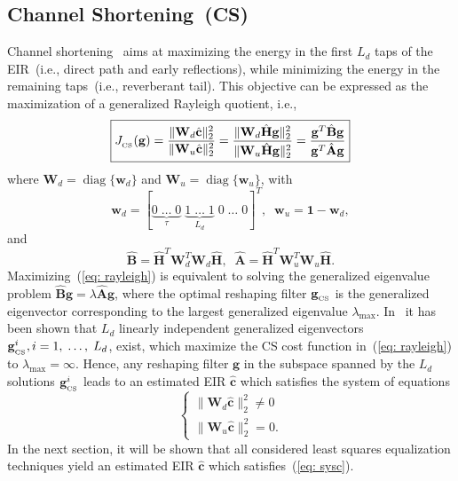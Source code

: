 \documentclass[10pt]{IEEEtran}
\DeclareMathOperator{\diag}{diag}
\begin{document}
\subsection{Channel Shortening~(CS)}
Channel shortening~\cite{Zhang_IWAENC_2010, Kallinger_ICASSP_2006} aims at maximizing the energy in the first $L_d$ taps of the EIR~(i.e., direct path and early reflections), while minimizing the energy in the remaining taps~(i.e., reverberant tail).
This objective can be expressed as the maximization of a generalized Rayleigh quotient, i.e.,
\begin{equation}
\label{eq: rayleigh}
\boxed{J_{_{\rm CS}} (\mathbf{g}) = \frac{\|\mathbf{W}_d\hat{\mathbf{c}}\|_2^2}{\|\mathbf{W}_u\hat{\mathbf{c}}\|_2^2} =  \frac{\|\mathbf{W}_d\hat{\mathbf{H}}\mathbf{g}\|_2^2}{\|\mathbf{W}_u\hat{\mathbf{H}}\mathbf{g}\|_2^2} = \frac{\mathbf{g}^T \hat{\mathbf{B}} \mathbf{g}}{\mathbf{g}^T \hat{\mathbf{A}} \mathbf{g}}}
\end{equation}
where $\mathbf{W}_d = {\diag}\{\mathbf{w}_d\}$ and $\mathbf{W}_u = {\diag}\{\mathbf{w}_u\}$, with
\begin{equation}
\label{eq: wincs}
\mathbf{w}_d  = [\underbrace{0 \; \ldots \; 0}_{\tau} \; \underbrace{1 \; \ldots \; 1}_{L_d}\; 0\; \ldots\; 0]^{T}, \; \; \mathbf{w}_u  = \mathbf{1} - \mathbf{w}_d,
\end{equation}
and
\begin{equation}
\hat{\mathbf{B}}  = \hat{\mathbf{H}}^{T} \mathbf{W}_d^T \mathbf{W}_d\hat{\mathbf{H}},\; \;  \hat{\mathbf{A}} = \hat{\mathbf{H}}^{T} \mathbf{W}_u^T \mathbf{W}_u\hat{\mathbf{H}}.
\end{equation}
Maximizing~(\ref{eq: rayleigh}) is equivalent to solving the generalized eigenvalue problem $\hat{\mathbf{B}} \mathbf{g} = \lambda \hat{\mathbf{A}} \mathbf{g}$, where the optimal reshaping filter $\mathbf{g}_{_{\rm CS}}$ is the generalized eigenvector corresponding to the largest generalized eigenvalue $\lambda_{\max}$.
In~\cite{Zhang_IWAENC_2010} it has been shown that $L_d$ linearly independent generalized eigenvectors $\mathbf{g}_{_{\rm CS}}^i, i = 1, \; \ldots, \; L_d$, exist, which maximize the CS cost function in~(\ref{eq: rayleigh}) to $\lambda_{\max} = \infty$.
Hence, any reshaping filter $\mathbf{g}$ in the subspace spanned by the $L_d$ solutions $\mathbf{g}_{_{\rm CS}}^i$ leads to an estimated EIR $\hat{\mathbf{c}}$ which satisfies the system of equations
\begin{equation}
\label{eq: sysc}
\begin{cases}
\|\mathbf{W}_d \hat{\mathbf{c}} \|_2^2 \neq 0 \\
\|\mathbf{W}_u \hat{\mathbf{c}} \|_2^2 = 0.
\end{cases}
\end{equation} 
In the next section, it will be shown that all considered least squares equalization techniques yield an estimated EIR $\hat{\mathbf{c}}$ which satisfies~(\ref{eq: sysc}).
\end{document}
